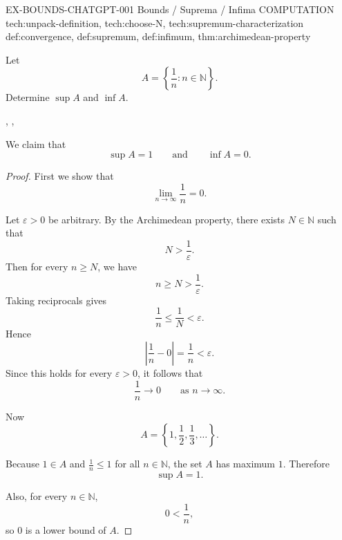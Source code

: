 
\GeneratedExerciseMeta
  {EX-BOUNDS-CHATGPT-001}
  {Bounds / Suprema / Infima}
  {COMPUTATION}
  {tech:unpack-definition, tech:choose-N, tech:supremum-characterization}
  {def:convergence, def:supremum, def:infimum, thm:archimedean-property}

\begin{generatedexerciseconstruction}

\begin{remark*}[Task]
Let
\[
A=\left\{\frac{1}{n}:n\in\mathbb{N}\right\}.
\]
Determine \(\sup A\) and \(\inf A\).
\end{remark*}

\begin{remark*}[Technique]
,
,
\end{remark*}

\begin{remark*}[Construction]
We claim that
\[
\sup A = 1
\qquad\text{and}\qquad
\inf A = 0.
\]
\end{remark*}

\begin{proof}
First we show that
\[
\lim_{n\to\infty}\frac{1}{n}=0.
\]

Let \(\varepsilon>0\) be arbitrary. By the Archimedean property, there exists
\(N\in\mathbb{N}\) such that
\[
N>\frac{1}{\varepsilon}.
\]
Then for every \(n\ge N\), we have
\[
n\ge N>\frac{1}{\varepsilon}.
\]
Taking reciprocals gives
\[
\frac{1}{n}\le \frac{1}{N}<\varepsilon.
\]
Hence
\[
\left|\frac{1}{n}-0\right|=\frac{1}{n}<\varepsilon.
\]
Since this holds for every \(\varepsilon>0\), it follows that
\[
\frac{1}{n}\to 0 \qquad \text{as } n\to\infty.
\]

Now
\[
A=\left\{1,\frac12,\frac13,\dots\right\}.
\]

Because \(1\in A\) and \(\frac1n\le 1\) for all \(n\in\mathbb{N}\), the set \(A\)
has maximum \(1\). Therefore
\[
\sup A = 1.
\]

Also, for every \(n\in\mathbb{N}\),
\[
0<\frac1n,
\]
so \(0\) is a lower bound of \(A\).


\end{proof}
\end{generatedexerciseconstruction}
